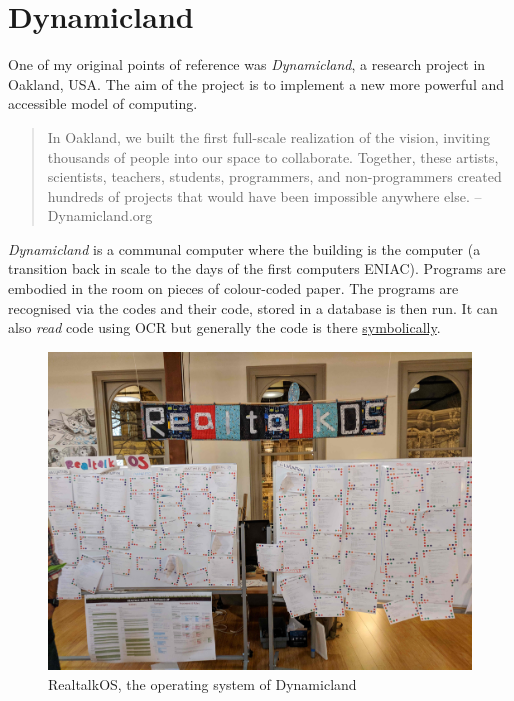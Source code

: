 \documentclass[12pt]{report}
\begin{document}
\section{Dynamicland}
\label{sec:org2b6bb98}

One of my original points of reference was \emph{Dynamicland}, a research project in
Oakland, USA. The aim of the project is to implement a new more powerful and
accessible model of computing.

\begin{quote}


In Oakland, we built the first full-scale realization of the vision, inviting
thousands of people into our space to collaborate. Together, these artists,
scientists, teachers, students, programmers, and non-programmers created
hundreds of projects that would have been impossible anywhere else.
-- Dynamicland.org
\end{quote}

\emph{Dynamicland} is a communal computer where the building is the computer (a
transition back in scale to the days of the first computers ENIAC). Programs are
embodied in the room on pieces of colour-coded paper. The programs are
recognised via the codes and their code, stored in a database is then run. It
can also \emph{read} code using OCR but generally the code is there \href{https://thenewstack.io/dynamicland-rethinks-computer-interfaces/}{symbolically}.

\begin{figure}[htbp]
\centering
\includegraphics[width=.9\linewidth]{assets/realtalk-os.jpg}
\caption{RealtalkOS, the operating system of Dynamicland}
\end{figure}
\end{document}
